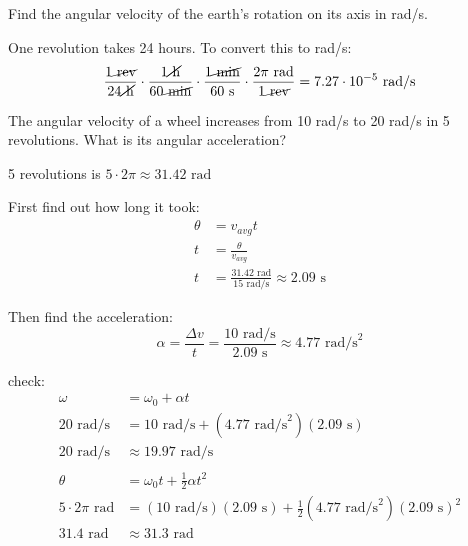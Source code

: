 \documentclass{exam}
\begin{document}
\begin{questions}
\item Find the angular velocity of the earth's rotation on its axis in rad/s.

\begin{solution}
One revolution takes 24 hours.  To convert this to rad/s:
\[
  \frac{1 \cancel{\text{ rev}}}{24 \cancel{\text{ h}}} 
      \cdot \frac{1 \cancel{\text{ h}}}{60 \cancel{\text{ min}}}
      \cdot \frac{1 \cancel{\text{ min}}}{60 \text{ s}}
      \cdot \frac{2 \pi \text{ rad}}{1 \cancel{\text{ rev}}}
      = 7.27 \cdot 10^{-5} \text{ rad/s}
\]

\end{solution}

\item The angular velocity of a wheel increases from 10 rad/s to 20 rad/s in 5 revolutions.  What is its angular
  acceleration?

\begin{solution}
5 revolutions is $5 \cdot 2 \pi \approx 31.42 \text{ rad}$

First find out how long it took:
\begin{align*}
  \theta &= v_{avg}t \\
  t &= \frac{\theta}{v_{avg}} \\
  t &= \frac{31.42 \text{ rad}}{15 \text{ rad/s}} \approx 2.09 \text{ s}
\end{align*}

Then find the acceleration:
\[
  \alpha = \frac{\Delta v}{t} = \frac{10 \text{ rad/s}}{2.09 \text{ s}} \approx 4.77 \text{ rad/s}^2
\]

check:
\begin{align*}
  \omega &= \omega_0 + \alpha t \\
  20 \text{ rad/s} &= 10 \text{ rad/s} + (4.77 \text{ rad/s}^2)(2.09 \text{ s}) \\ 
  20 \text{ rad/s} &\approx 19.97 \text{ rad/s} \\
  \\
   \theta &= \omega_0 t + \frac{1}{2} \alpha t^2 \\
  5 \cdot 2 \pi \text{ rad} &= (10 \text{ rad/s})(2.09 \text{ s}) + \frac{1}{2} (4.77 \text{ rad/s}^2) (2.09 \text{ s})^2 \\
  31.4 \text{ rad} &\approx 31.3 \text{ rad} \\
\end{align*}

\end{solution}



\end{questions}
\end{document}

